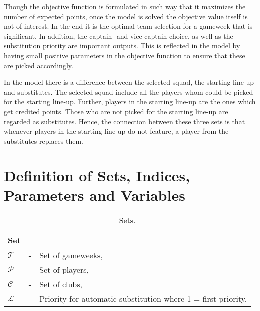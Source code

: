 \newpar

Though the objective function is formulated in such way that it maximizes the number of expected points, once the model is solved  the objective value itself is not of interest. In the end it is the optimal team selection for a gameweek that is significant. In addition, the captain- and vice-captain choice, as well as the substitution priority are important outputs. This is reflected in the model by having small positive parameters in the objective function to ensure that these are picked accordingly. 

\newpar

In the model there is a difference between the selected squad, the starting line-up and substitutes. The selected squad include all the players whom could be picked for the starting line-up. Further, players in the starting line-up are the ones which get credited points. Those who are not picked for the starting line-up are regarded as substitutes. Hence, the connection between these three sets is that whenever players in the starting line-up do not feature, a player from the substitutes replaces them.



\section{Definition of Sets, Indices, Parameters and Variables}\label{def_sets_ind_par_var}

\begin{table}[H]
\centering
\caption{Sets.}
\begin{tabular}{@{}lll@{}}
\toprule
Set           &   &                                                               \\ \midrule
$\mathcal{T}$ & - & Set of gameweeks,                                             \\
$\mathcal{P}$ & - & Set of players,                                               \\
$\mathcal{C}$ & - & Set of clubs,                                                 \\
$\mathcal{L}$ & - & Priority for automatic substitution where 1 = first priority. \\ \bottomrule
\end{tabular}
\end{table}

